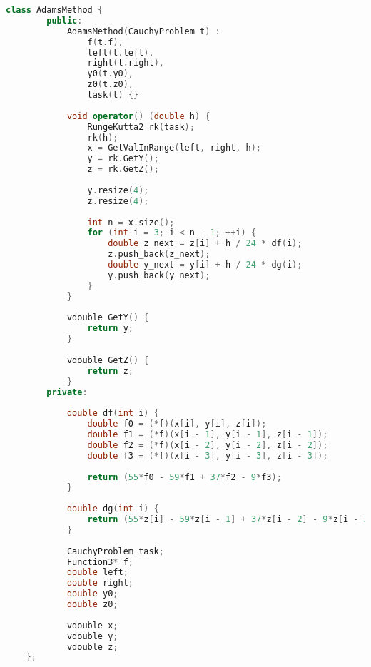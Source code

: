 \begin{lstlisting}[language=C++]
    class AdamsMethod {
        public:
            AdamsMethod(CauchyProblem t) :
                f(t.f),
                left(t.left),
                right(t.right),
                y0(t.y0),
                z0(t.z0),
                task(t) {}
            
            void operator() (double h) {
                RungeKutta2 rk(task);
                rk(h);
                x = GetValInRange(left, right, h);
                y = rk.GetY();
                z = rk.GetZ();
    
                y.resize(4);
                z.resize(4);
    
                int n = x.size();
                for (int i = 3; i < n - 1; ++i) {
                    double z_next = z[i] + h / 24 * df(i);
                    z.push_back(z_next);
                    double y_next = y[i] + h / 24 * dg(i);
                    y.push_back(y_next);
                }
            }
    
            vdouble GetY() {
                return y;
            }
    
            vdouble GetZ() {
                return z;
            }
        private:
    
            double df(int i) {
                double f0 = (*f)(x[i], y[i], z[i]);
                double f1 = (*f)(x[i - 1], y[i - 1], z[i - 1]);
                double f2 = (*f)(x[i - 2], y[i - 2], z[i - 2]);
                double f3 = (*f)(x[i - 3], y[i - 3], z[i - 3]);
    
                return (55*f0 - 59*f1 + 37*f2 - 9*f3);
            }
    
            double dg(int i) {
                return (55*z[i] - 59*z[i - 1] + 37*z[i - 2] - 9*z[i - 3]);
            }
    
            CauchyProblem task;
            Function3* f;
            double left;
            double right;
            double y0;
            double z0;
    
            vdouble x;
            vdouble y;
            vdouble z;
    };
\end{lstlisting}



\pagebreak
